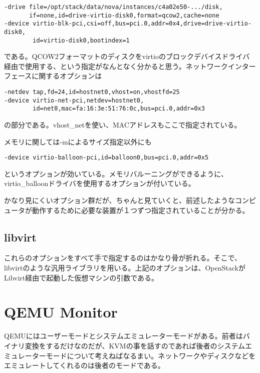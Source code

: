 \documentclass[9pt,b5paper,tombo]{jsbook}
\begin{document}
\begin{lstlisting}
-drive file=/opt/stack/data/nova/instances/c4a02e50-.../disk,
       if=none,id=drive-virtio-disk0,format=qcow2,cache=none
-device virtio-blk-pci,csi=off,bus=pci.0,addr=0x4,drive=drive-virtio-disk0,
        id=virtio-disk0,bootindex=1
\end{lstlisting}

である。QCOW2フォーマットのディスクをvirtioのブロックデバイスドライバ経由で使用する、という指定がなんとなく分かると思う。ネットワークインターフェースに関するオプションは

\begin{lstlisting}
-netdev tap,fd=24,id=hostnet0,vhost=on,vhostfd=25
-device virtio-net-pci,netdev=hostnet0,
        id=net0,mac=fa:16:3e:51:76:0c,bus=pci.0,addr=0x3
\end{lstlisting}

の部分である。vhost\_netを使い、MACアドレスもここで指定されている。

メモリに関しては-mによるサイズ指定以外にも

\begin{lstlisting}
-device virtio-balloon-pci,id=balloon0,bus=pci.0,addr=0x5
\end{lstlisting}

というオプションが効いている。メモリバルーニングができるように、virtio\_balloonドライバを使用するオプションが付いている。

かなり見にくいオプション群だが、ちゃんと見ていくと、前述したようなコンピュータが動作するために必要な装置が１つずつ指定されていることが分かる。

\subsection{libvirt}

これらのオプションをすべて手で指定するのはかなり骨が折れる。そこで、libvirtのような汎用ライブラリを用いる。上記のオプションは、OpenStackがLibvirt経由で起動した仮想マシンの引数である。

\section{QEMU Monitor}

QEMUにはユーザーモードとシステムエミュレーターモードがある。前者はバイナリ変換をするだけなのだが、KVMの事を話すのであれば後者のシステムエミュレーターモードについて考えねばなるまい。ネットワークやディスクなどをエミュレートしてくれるのは後者のモードである。
\end{document}
